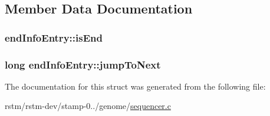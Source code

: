 \subsection{Member Data Documentation}
\hypertarget{structendInfoEntry_a593a387d50c0d6d484fbee4e1cc60f1f}{
\subsubsection[{is\-End}]{ end\-Info\-Entry\-::is\-End}}\label{structendInfoEntry_a593a387d50c0d6d484fbee4e1cc60f1f}
\hypertarget{structendInfoEntry_a343f8955761cbdc1be01e9c787d75d72}{
\subsubsection[{jump\-To\-Next}]{\setlength{\rightskip}{0pt plus 5cm}long end\-Info\-Entry\-::jump\-To\-Next}}\label{structendInfoEntry_a343f8955761cbdc1be01e9c787d75d72}


The documentation for this struct was generated from the following file\-:\begin{DoxyCompactItemize}
\item 
rstm/rstm-\/dev/stamp-\/0../genome/\hyperlink{sequencer_8c}{sequencer.\-c}\end{DoxyCompactItemize}
